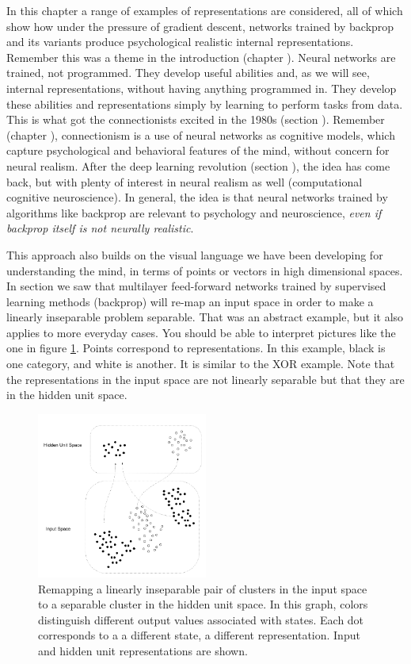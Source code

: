 In this chapter a range of examples of representations are considered, all of which show how under the pressure of gradient descent, networks trained by backprop and its variants produce psychological realistic internal representations. Remember this was a theme in the introduction (chapter ). Neural networks are trained, not programmed. They develop useful abilities and, as we will see, internal representations, without having anything programmed in. They develop these abilities and representations simply by learning to perform tasks from data. This is what got the connectionists excited in the 1980s (section ). Remember (chapter ), connectionism is a use of neural networks as cognitive models, which capture psychological and behavioral features of the mind, without concern for neural realism. After the deep learning revolution (section ), the idea has come back, but with plenty of interest in neural realism as well (computational cognitive neuroscience).  In general, the idea is that neural networks trained by algorithms like backprop are relevant to psychology and neuroscience, \emph{even if backprop itself is not neurally realistic}.

This approach also builds on the visual language we have been developing for understanding the mind, in terms of points or vectors in high dimensional spaces. In section  we saw that multilayer feed-forward networks trained by supervised learning methods (\eg backprop) will re-map an input space in order to make a linearly inseparable problem separable. That was an abstract example, but it also applies to more everyday cases. You should be able to interpret pictures like the one in figure \ref{remappingClusters}.  Points correspond to representations. In this example, black is one category, and white is another. It is similar to the XOR example.  Note that the representations in the input space are not linearly separable but that they are in the hidden unit space.
\begin{figure}[h]
\centering
\includegraphics[width=0.5\textwidth]{images/remappingClusters}
\caption[Jeff Yoshimi.]{Remapping a linearly inseparable pair of clusters in the input space to a separable cluster in the hidden unit space. In this graph, colors distinguish different output values associated with states. Each dot corresponds to a a different state, a different representation. Input and hidden unit representations are shown.}
\label{remappingClusters}
\end{figure}

